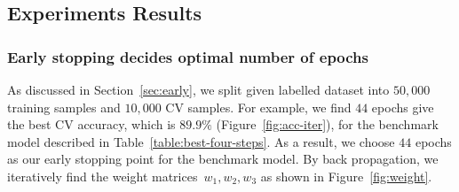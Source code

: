\subsection{Experiments Results}
\subsubsection{Early stopping decides optimal number of epochs}
As discussed in Section~\ref{sec:early}, we split given labelled dataset into $50,000$ training samples and $10,000$ CV samples. For example, we find $44$ epochs give the best CV accuracy, which is $89.9\%$ (Figure~\ref{fig:acc-iter}), for the benchmark model described in Table~\ref{table:best-four-steps}. As a result, we choose $44$ epochs as our early stopping point for the benchmark model. By back propagation, we iteratively find the weight matrices~$w_1,w_2,w_3$ as shown in Figure~\ref{fig:weight}.

